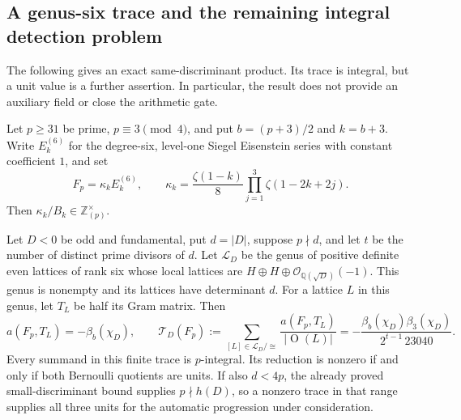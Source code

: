 \subsection{A genus-six trace and the remaining integral detection problem}

The following gives an exact same-discriminant product.  Its trace is
integral, but a unit value is a further assertion.  In particular, the
result does not provide an auxiliary field or close the arithmetic gate.

\begin{proposition}
Let $p\geq31$ be prime, $p\equiv3\pmod4$, and put
$b=(p+3)/2$ and $k=b+3$.  Write $E_k^{(6)}$ for the degree-six,
level-one Siegel Eisenstein series with constant coefficient $1$, and set
\begin{equation}
 F_p=\kappa_k E_k^{(6)},\qquad
 \kappa_k=\frac{\zeta(1-k)}8
                  \prod_{j=1}^3\zeta(1-2k+2j).
 \tag{SG.1}
\end{equation}
Then $\kappa_k/B_k\in\mathbb Z_{(p)}^\times$.

Let $D<0$ be odd and fundamental, put $d=|D|$, suppose $p\nmid d$,
and let $t$ be the number of distinct prime divisors of $d$.
Let $\mathcal L_D$ be the genus of positive definite even lattices of
rank six whose local lattices are
$H\oplus H\oplus\mathcal O_{\mathbb Q(\sqrt D)}(-1)$.
This genus is nonempty and its lattices have determinant $d$.
For a lattice $L$ in this genus, let $T_L$ be half its Gram matrix.
Then
\begin{equation}
 a(F_p,T_L)=-\beta_b(\chi_D),\qquad
 \mathcal T_D(F_p):=
  \sum_{[L]\in\mathcal L_D/\cong}
             \frac{a(F_p,T_L)}{|\operatorname O(L)|}
 =-\frac{\beta_b(\chi_D)\beta_3(\chi_D)}
                    {2^{t-1}\,23040}.
 \tag{SG.2}
\end{equation}
Every summand in this finite trace is $p$-integral.  Its reduction is
nonzero if and only if both Bernoulli quotients are units.  If also
$d<4p$, the already proved small-discriminant bound supplies
$p\nmid h(D)$, so a nonzero trace in that range supplies all three
units for the automatic progression under consideration.
\end{proposition}

